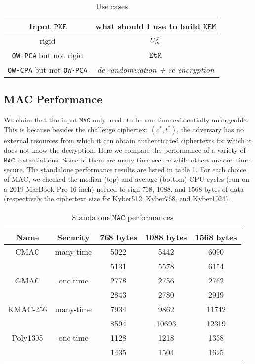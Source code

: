 \documentclass[floatrow,journal=tches,submission]{iacrtrans}
\newcommand{\monospace}{\texttt}
\newcommand{\pke}{\monospace{PKE}}
\newcommand{\kem}{\monospace{KEM}}
\newcommand{\etm}{\monospace{EtM}}  %
\newcommand{\mac}{\monospace{MAC}}
\begin{document}
\begin{table}[H]
    \begin{tabular}{|c|c|}
        \hline
        Input $\pke$ & what should I use to build $\kem$ \\
        \hline
        rigid & $U^{\not\bot}_m$ \\
        \hline
        \monospace{OW-PCA} but not rigid & $\etm$ \\
        \hline
        \monospace{OW-CPA} but not \monospace{OW-PCA} & \emph{de-randomization + re-encryption} \\
        \hline
    \end{tabular}
    \caption{Use cases}
\end{table}

\subsection{MAC Performance}\label{sec:mac-performance}
We claim that the input $\mac$ only needs to be one-time existentially unforgeable. This is because besides the challenge ciphertext $(c^\ast, t^\ast)$, the adversary has no external resources from which it can obtain authenticated ciphertexts for which it does not know the decryption. Here we compare the performance of a variety of $\mac$ instantiations. Some of them are many-time secure while others are one-time secure. The standalone performance results are listed in table \ref{tbl:standalone-mac-perf}. For each choice of MAC, we checked the median (top) and average (bottom) CPU cycles (run on a 2019 MacBook Pro 16-inch) needed to sign 768, 1088, and 1568 bytes of data (respectively the ciphertext size for Kyber512, Kyber768, and Kyber1024).

\begin{table}[H]
    \centering
    \begin{tabular}{|c|c|c|c|c|}
        \hline
        Name & Security & 768 bytes & 1088 bytes & 1568 bytes \\
        \hline
        CMAC & many-time & 5022 & 5442 & 6090 \\
        & & 5131 & 5578 & 6154 \\
        \hline
        GMAC & one-time & 2778 & 2756 & 2762 \\
        & & 2843 & 2780 & 2919 \\
        \hline
        KMAC-256 & many-time & 7934 & 9862 & 11742 \\
        & & 8594 & 10693 & 12319 \\
        \hline
        Poly1305 & one-time & 1128 & 1218 & 1338 \\
        & & 1435 & 1504 & 1625 \\
        \hline
    \end{tabular}
    \caption{Standalone $\mac$ performances}\label{tbl:standalone-mac-perf}
\end{table}
\end{document}
